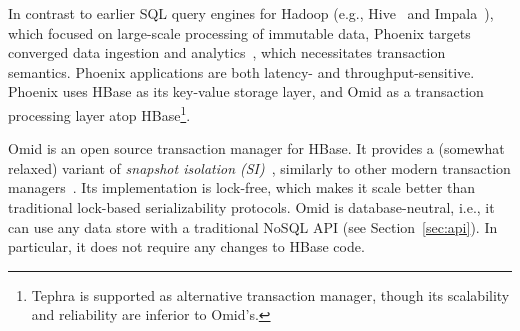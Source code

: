 In contrast to earlier SQL query engines for Hadoop (e.g., 
Hive~\cite{hive} and Impala~\cite{impala}), which focused on large-scale processing
of immutable data, Phoenix targets converged data ingestion and analytics~\cite{PhoenixUseCases},
which necessitates transaction semantics. Phoenix
applications are both latency- and throughput-sensitive. Phoenix uses HBase 
as its key-value storage layer, and Omid as a transaction processing layer atop HBase\footnote{\small{Tephra 
is supported as alternative transaction manager, though its scalability and reliability are inferior to Omid's.}}. 

Omid is an open source transaction manager for HBase. 
It provides a (somewhat relaxed) variant of \emph{snapshot isolation (SI)}~\cite{DBLP:conf/sigmod/BerensonBGMOO95}, similarly to other modern transaction managers~\cite{Percolator2010,Spanner2012,tephra,cockroach}. Its implementation is lock-free, 
which makes it scale better than traditional lock-based serializability protocols.
Omid is database-neutral, i.e., it  can use any data store with a
traditional NoSQL API (see Section~\ref{sec:api}). 
In particular, it does not require any changes to HBase code.  

